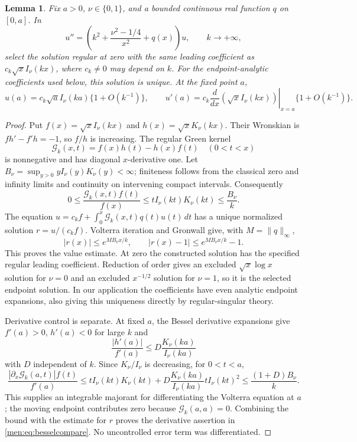\documentclass[11pt,letterpaper]{article}
\newtheorem{lemma}[theorem]{Lemma}
\theoremstyle{remark}\newtheorem{remark}[theorem]{Remark}
\begin{document}
\begin{lemma}\label{men:lem:bessel}
Fix $a>0$, $\nu\in\{0,1\}$, and a bounded continuous real function $q$ on $[0,a]$. In
\[
 u''=\left(k^2+\frac{\nu^2-1/4}{x^2}+q(x)\right)u,
 \qquad k\to+\infty,
\]
select the solution regular at zero with the same leading coefficient as
$c_k\sqrt{x}I_\nu(kx)$, where $c_k\ne0$ may depend on $k$. For the endpoint-analytic coefficients used below, this solution is unique. At the fixed point $a$,
\begin{equation}\label{men:eq:besselcompare}
 u(a)=c_k\sqrt a I_\nu(ka)\{1+O(k^{-1})\},\qquad
 u'(a)=c_k\left.\frac d{dx}(\sqrt x I_\nu(kx))\right|_{x=a}
                      \{1+O(k^{-1})\}.
\end{equation}
\end{lemma}
\begin{proof}
Put $f(x)=\sqrt{x}I_\nu(kx)$ and $h(x)=\sqrt{x}K_\nu(kx)$. Their Wronskian is $fh'-f'h=-1$, so $f/h$ is increasing. The regular Green kernel
\[
 \mathcal G_k(x,t)=f(x)h(t)-h(x)f(t)\quad(0<t<x)
\]
is nonnegative and has diagonal $x$-derivative one. Let
$B_\nu=\sup_{y>0}yI_\nu(y)K_\nu(y)<\infty$; finiteness follows from the classical zero and infinity limits and continuity on intervening compact intervals. Consequently
\begin{equation}\label{men:eq:greenbound}
 0\le\frac{\mathcal G_k(x,t)f(t)}{f(x)}
 \le tI_\nu(kt)K_\nu(kt)\le\frac{B_\nu}k.
\end{equation}
The equation $u=c_kf+\int_0^x\mathcal G_k(x,t)q(t)u(t)\,dt$ has a unique normalized solution $r=u/(c_kf)$. Volterra iteration and Gronwall give, with $M=\|q\|_\infty$,
\[
 |r(x)|\le e^{MB_\nu x/k},\qquad
 |r(x)-1|\le e^{MB_\nu x/k}-1.
\]
This proves the value estimate. At zero the constructed solution has the specified regular leading coefficient. Reduction of order gives an excluded $\sqrt{x}\log x$ solution for $\nu=0$ and an excluded $x^{-1/2}$ solution for $\nu=1$, so it is the selected endpoint solution. In our application the coefficients have even analytic endpoint expansions, also giving this uniqueness directly by regular-singular theory.

Derivative control is separate. At fixed $a$, the Bessel derivative expansions give $f'(a)>0$, $h'(a)<0$ for large $k$ and
\[
 \frac{|h'(a)|}{f'(a)}\le D\frac{K_\nu(ka)}{I_\nu(ka)}
\]
with $D$ independent of $k$. Since $K_\nu/I_\nu$ is decreasing, for $0<t<a$,
\[
 \frac{|\partial_x\mathcal G_k(a,t)|f(t)}{f'(a)}
 \le tI_\nu(kt)K_\nu(kt)
  +D\frac{K_\nu(ka)}{I_\nu(ka)}tI_\nu(kt)^2
 \le\frac{(1+D)B_\nu}k.
\]
This supplies an integrable majorant for differentiating the Volterra equation at $a$; the moving endpoint contributes zero because $\mathcal G_k(a,a)=0$. Combining the bound with the estimate for $r$ proves the derivative assertion in \eqref{men:eq:besselcompare}. No uncontrolled error term was differentiated.
\end{proof}
\end{document}
